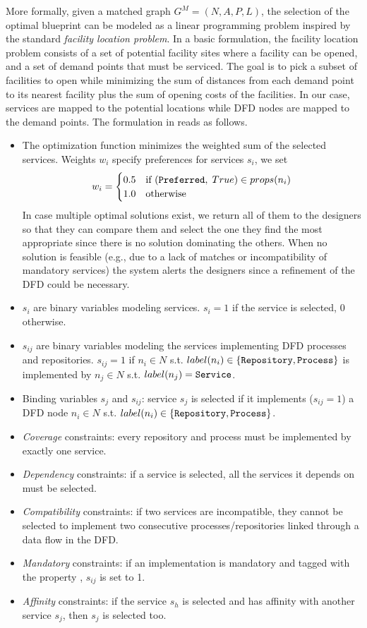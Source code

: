 More formally, given a matched graph $G^M=(N, A, P, L)$, the selection of the optimal blueprint can be modeled as a linear programming problem inspired by the standard \emph{facility location problem}. In a basic formulation, the facility location problem consists of a set of potential facility sites where a facility can be opened, and a set of demand points that must be serviced. The goal is to pick a subset of facilities to open while minimizing the sum of distances from each demand point to its nearest facility plus the sum of opening costs of the facilities. In our case, services are mapped to the potential locations while DFD nodes are mapped to the demand points. The formulation in  reads as follows.
\begin{itemize}
    \item[(1)] The optimization function minimizes the weighted sum of the selected services. Weights $w_i$ specify preferences for services $s_i$, we set
    \[
    w_i=\begin{cases}
    0.5 & \textup{if } (\texttt{Preferred},\;True) \in props(n_i)\\
    1.0 & \textup{otherwise}
    \end{cases}
    \]
    In case multiple optimal solutions exist, we return all of them to the designers so that they can compare them and select the one they find the most appropriate since there is no solution dominating the others. When no solution is feasible (e.g., due to a lack of matches or incompatibility of mandatory services) the system alerts the designers since a refinement of the DFD could be necessary.
    \item[(2)] $s_i$ are binary variables modeling services. $s_i=1$ if the service is selected, $0$ otherwise.
    \item[(3)] $s_{ij}$ are binary variables modeling the services implementing DFD processes and repositories. $s_{ij}=1$ if $n_i \in N$ s.t. $label(n_i) \in \{\texttt{Repository}, \texttt{Process}\}$ is implemented by $n_j \in N$ s.t. $label(n_j) = \texttt{Service}$.
    \item[(4)] Binding variables $s_j$ and $s_{ij}$: service $s_j$ is selected if it implements ($s_{ij}=1$) a DFD node $n_i \in N$ s.t. $label(n_i) \in \{\texttt{Repository}, \texttt{Process}\}$.
    \item[(5)] \emph{Coverage} constraints: every repository and process must be implemented by exactly one service.
    \item[(6)] \emph{Dependency} constraints: if a service is selected, all the services it depends on must be selected.
    \item[(7)] \emph{Compatibility} constraints: if two services are incompatible, they cannot be selected to implement two consecutive processes/repositories linked through a data flow in the DFD.
    \item[(8)] \emph{Mandatory} constraints: if an implementation is mandatory and tagged with the property , $s_{ij}$ is set to 1.
    \item[(9)] \emph{Affinity} constraints: if the service $s_h$ is selected and has affinity with another service $s_j$, then $s_j$ is selected too.
\end{itemize}

